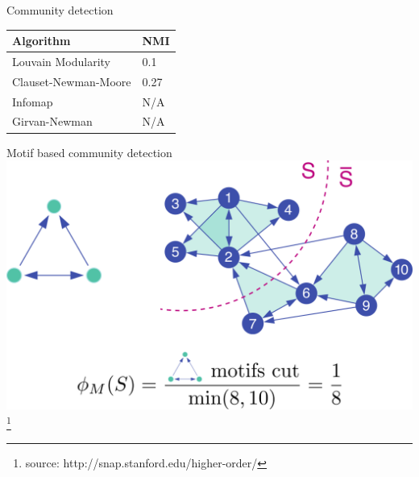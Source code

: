 \documentclass[unknownkeysallowed]{beamer}
\begin{document}
\begin{frame}{Community detection}

  \centering
  \begin{tabular}{l|l}
    Algorithm & NMI \\ \hline
    Louvain Modularity & 0.1 \\
    Clauset-Newman-Moore & 0.27 \\
    Infomap & N/A \\
    Girvan-Newman & N/A
  \end{tabular}

\end{frame}

\begin{frame}{Motif based community detection}
  \includegraphics[width=\textwidth]{benson}
  \footnote{source: http://snap.stanford.edu/higher-order/}
\end{frame}
\end{document}
